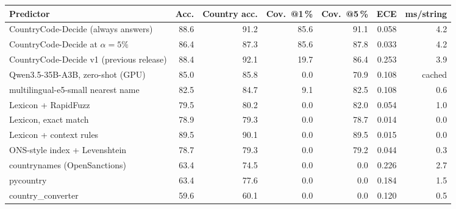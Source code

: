 \begin{tabular}{lrrrrrr}
\toprule
Predictor & Acc. & Country acc. & Cov.\ @1\,\% & Cov.\ @5\,\% & ECE & ms/string \\
\midrule
CountryCode-Decide (always answers) & 88.6 & 91.2 & 85.6 & 91.1 & 0.058 & 4.2 \\
CountryCode-Decide at $\alpha = 5\%$ & 86.4 & 87.3 & 85.6 & 87.8 & 0.033 & 4.2 \\
CountryCode-Decide v1 (previous release) & 88.4 & 92.1 & 19.7 & 86.4 & 0.253 & 3.9 \\
\midrule
Qwen3.5-35B-A3B, zero-shot (GPU) & 85.0 & 85.8 & 0.0 & 70.9 & 0.108 & cached \\
multilingual-e5-small nearest name & 82.5 & 84.7 & 9.1 & 82.5 & 0.108 & 0.6 \\
Lexicon + RapidFuzz & 79.5 & 80.2 & 0.0 & 82.0 & 0.054 & 1.0 \\
Lexicon, exact match & 78.9 & 79.3 & 0.0 & 78.7 & 0.014 & 0.0 \\
Lexicon + context rules & 89.5 & 90.1 & 0.0 & 89.5 & 0.015 & 0.0 \\
ONS-style index + Levenshtein & 78.7 & 79.3 & 0.0 & 79.2 & 0.044 & 0.3 \\
countrynames (OpenSanctions) & 63.4 & 74.5 & 0.0 & 0.0 & 0.226 & 2.7 \\
pycountry & 63.4 & 77.6 & 0.0 & 0.0 & 0.184 & 1.5 \\
country\_converter & 59.6 & 60.1 & 0.0 & 0.0 & 0.120 & 0.5 \\
\bottomrule
\end{tabular}
